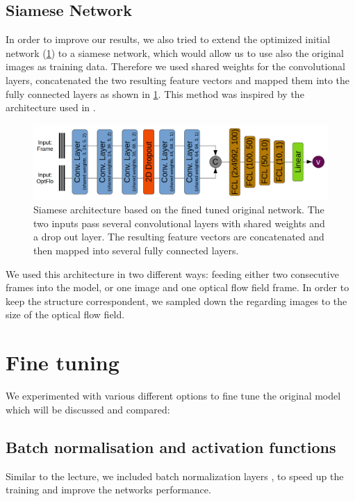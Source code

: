 \documentclass[conference]{IEEEtran}
\begin{document}
\subsection{Siamese Network}
\label{subsec:SiameseNetork}
In order to improve our results, we also tried to extend the optimized initial network (\cref{sec:fineTuning}) 
to a siamese network, which would allow us to use also the original images as training data. Therefore we used shared weights for the convolutional layers, concatenated 
the two resulting feature vectors and mapped them into the fully connected layers as shown in \cref{fig:siameseNetwork}. This method was inspired by the architecture used in
\cite{Wang2017}. 
\begin{figure}[ht]
	\centering
	\includegraphics[width=0.9\columnwidth]{imgs/siamese_model.png}
	\caption{Siamese architecture based on the fined tuned original network. The two inputs pass 
	several convolutional layers with shared weights and a drop out layer. The resulting
	feature vectors are concatenated and then mapped into several fully connected layers.}
	\label{fig:siameseNetwork}
\end{figure}
We used this architecture in two different ways: feeding either two consecutive frames into the model, or one image and one optical flow field frame. In order to keep the structure correspondent, we 
sampled down the regarding images to the size of the optical flow field.

\section{Fine tuning}
\label{sec:fineTuning}

We experimented with various different options to fine tune the original model which will be discussed and compared:

\subsection{Batch normalisation and activation functions}
Similar to the lecture, we included batch normalization layers \cite{BatchNorm2015}, to speed up
the training and improve the networks performance.
\end{document}
